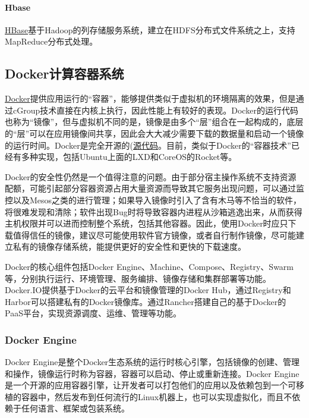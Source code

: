 \documentclass[letterpaper,10pt,english]{sphinxmanual}
\begin{document}
\paragraph{Hbase}
\label{gispark_cloud:Hbase}
\href{http://hbase.apache.org/}{HBase}基于Hadoop的列存储服务系统，建立在HDFS分布式文件系统之上，支持MapReduce分布式处理。


\subsection{Docker计算容器系统}
\label{gispark_cloud:Docker_u8ba1_u7b97_u5bb9_u5668_u7cfb_u7edf}
\href{http://www.docker.io}{Docker}提供应用运行的“容器”，能够提供类似于虚拟机的环境隔离的效果，但是通过cGroup技术直接在内核上执行，因此性能上有较好的表现。Docker的运行代码也称为“镜像”，但与虚拟机不同的是，镜像是由多个“层”组合在一起构成的，底层的“层”可以在应用镜像间共享，因此会大大减少需要下载的数据量和启动一个镜像的运行时间。Docker是完全开源的(\href{https://github.com/docker/docker}{源代码}。目前，类似于Docker的“容器技术”已经有多种实现，包括Ubuntu上面的LXD和CoreOS的Rocket等。

Docker的安全性仍然是一个值得注意的问题。由于部分宿主操作系统不支持资源配额，可能引起部分容器资源占用大量资源而导致其它服务出现问题，可以通过监控以及Mesos之类的进行管理；如果导入镜像时引入了含有木马等不恰当的软件，将很难发现和清除；软件出现Bug时将导致容器内进程从沙箱逃逸出来，从而获得主机权限并可以进而控制整个系统，包括其他容器。因此，使用Docker时应只下载值得信任的镜像，建议尽可能使用软件官方镜像，或者自行制作镜像，尽可能建立私有的镜像存储系统，能提供更好的安全性和更快的下载速度。

Docker的核心组件包括Docker
Engine、Machine、Compose、Registry、Swarm等，分别执行运行、环境管理、服务编排、镜像存储和集群部署等功能。Docker.IO提供基于Docker的云平台和镜像管理的Docker
Hub，通过Registry和Harbor可以搭建私有的Docker镜像库。通过Rancher搭建自己的基于Docker的PaaS平台，实现资源调度、运维、管理等功能。


\subsubsection{Docker Engine}
\label{gispark_cloud:Docker-Engine}
Docker
Engine是整个Docker生态系统的运行时核心引擎，包括镜像的创建、管理和操作，镜像运行时称为容器，容器可以启动、停止或重新连接。Docker
Engine是一个开源的应用容器引擎，让开发者可以打包他们的应用以及依赖包到一个可移植的容器中，然后发布到任何流行的Linux机器上，也可以实现虚拟化，而且不依赖于任何语言、框架或包装系统。
\end{document}
